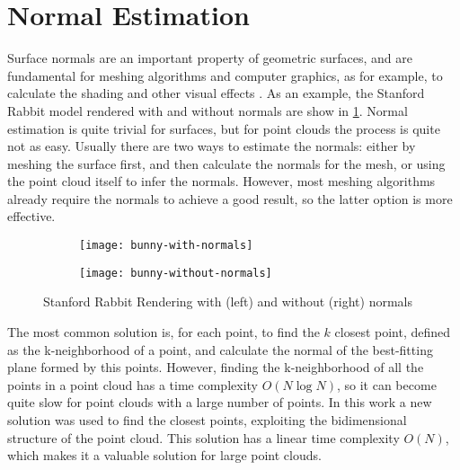 \section{Normal Estimation}
\label{section:normal-estimation}

Surface normals are an important property of geometric surfaces, and are fundamental for meshing algorithms and computer graphics, as for example, to calculate the shading and other visual effects \cite{pcl-normal-estimation}. As an example, the Stanford Rabbit model rendered with and without normals are show in \cref{figure:bunny-normals}. Normal estimation is quite trivial for surfaces, but for point clouds the process is quite not as easy. Usually there are two ways to estimate the normals: either by meshing the surface first, and then calculate the normals for the mesh, or using the point cloud itself to infer the normals. However, most meshing algorithms already require the normals to achieve a good result, so the latter option is more effective.

\begin{figure}[h]
    
    \centering
    \begin{subfigure}{0.4\textwidth}
        \centering
        \texttt{[image: bunny-with-normals]}     
    \end{subfigure}%
    \begin{subfigure}{0.4\textwidth}
        \centering
        \texttt{[image: bunny-without-normals]}     
    \end{subfigure}

    \caption{Stanford Rabbit Rendering with (left) and without (right) normals}
    \label{figure:bunny-normals}

\end{figure}

The most common solution is, for each point, to find the $k$ closest point, defined as the k-neighborhood of a point, and calculate the normal of the best-fitting plane formed by this points. However, finding the k-neighborhood of all the points in a point cloud has a time complexity $O(N \log N)$, so it can become quite slow for point clouds with a large number of points. In this work a new solution was used to find the closest points, exploiting the bidimensional structure of the point cloud. This solution has a linear time complexity $O(N)$, which makes it a valuable solution for large point clouds.

